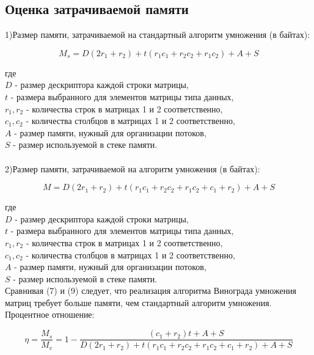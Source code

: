 \documentclass[a4paper,12pt]{article}
\begin{document}
\newpage
\subsection{Оценка затрачиваемой памяти}
1)Размер памяти, затрачиваемой на стандартный алгоритм умножения (в байтах):
\begin{center}
\begin{equation}
M_s = D(2r_1 + r_2)  + t(r_1c_1 + r_2c_2 + r_1c_2) + A + S
\end{equation}
\end{center}
где \\
$D$ - размер дескриптора каждой строки матрицы,\\
$t$ - размера выбранного для элементов матрицы типа данных,\\
$r_1, r_2$ - количества строк в матрицах 1 и 2 соответственно,\\
$c_1, c_2$ - количества столбцов в матрицах 1 и 2 соответственно,\\
$A$ - размер памяти, нужный для организации потоков,\\
$S$ - размер используемой в стеке памяти.\\
\\
2)Размер памяти, затрачиваемой на алгоритм умножения (в байтах):
\begin{center}
\begin{equation}
M = D(2r_1 + r_2)  + t(r_1c_1 + r_2c_2 + r_1c_2 + c_1 + r_2) + A + S
\end{equation}
\end{center}
где \\
$D$ - размер дескриптора каждой строки матрицы,\\
$t$ - размера выбранного для элементов матрицы типа данных,\\
$r_1, r_2$ - количества строк в матрицах 1 и 2 соответственно,\\
$c_1, c_2$ - количества столбцов в матрицах 1 и 2 соответственно,\\
$A$ - размер памяти, нужный для организации потоков,\\
$S$ - размер используемой в стеке памяти.\\

Сравнивая (7) и (9) следует, что реализация алгоритма Винограда умножения матриц требует больше памяти, чем стандартный алгоритм умножения. \\
Процентное отношение:\\
\begin{center}
\begin{equation}
\eta = \frac{M_s}{M_v} = 1 - \frac{(c_1 + r_2)t + A + S}{D(2r_1 + r_2)  + t(r_1c_1 + r_2c_2 + r_1c_2 + c_1 + r_2) + A + S}
\end{equation}
\end{center}
\end{document}
